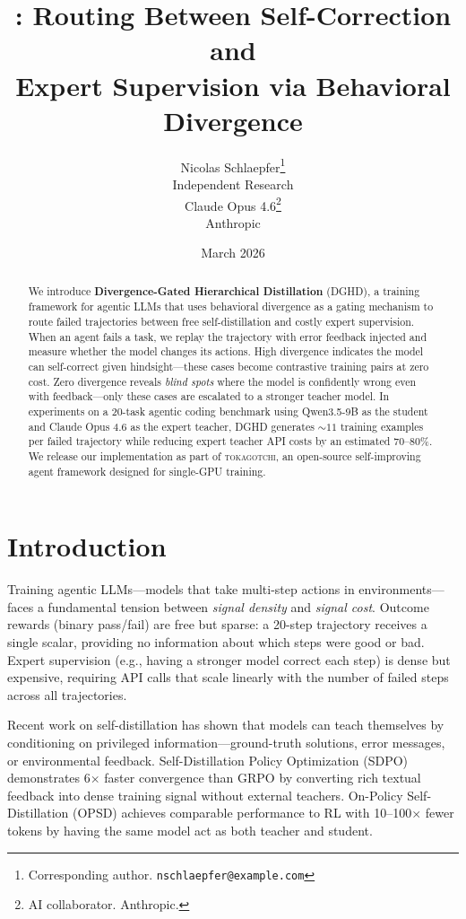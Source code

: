 \documentclass[11pt]{article}
\title{\ourslong{}: Routing Between Self-Correction and\\Expert Supervision via Behavioral Divergence}
\author{
  Nicolas Schlaepfer\thanks{Corresponding author. \texttt{nschlaepfer@example.com}} \\
  Independent Research \\
  \And
  Claude Opus 4.6\thanks{AI collaborator. Anthropic.} \\
  Anthropic
}
\date{March 2026}
\newcommand{\ours}{DGHD}
\newcommand{\ourslong}{Divergence-Gated Hierarchical Distillation}
\begin{document}
\maketitle

\begin{abstract}
We introduce \textbf{\ourslong{}} (\ours{}), a training framework for agentic LLMs that uses behavioral divergence as a gating mechanism to route failed trajectories between free self-distillation and costly expert supervision. When an agent fails a task, we replay the trajectory with error feedback injected and measure whether the model changes its actions. High divergence indicates the model can self-correct given hindsight---these cases become contrastive training pairs at zero cost. Zero divergence reveals \emph{blind spots} where the model is confidently wrong even with feedback---only these cases are escalated to a stronger teacher model. In experiments on a 20-task agentic coding benchmark using Qwen3.5-9B as the student and Claude Opus 4.6 as the expert teacher, \ours{} generates ${\sim}11$ training examples per failed trajectory while reducing expert teacher API costs by an estimated 70--80\%. We release our implementation as part of \textsc{tokagotchi}, an open-source self-improving agent framework designed for single-GPU training.
\end{abstract}

\section{Introduction}
\label{sec:intro}

Training agentic LLMs---models that take multi-step actions in environments---faces a fundamental tension between \emph{signal density} and \emph{signal cost}. Outcome rewards (binary pass/fail) are free but sparse: a 20-step trajectory receives a single scalar, providing no information about which steps were good or bad. Expert supervision (e.g., having a stronger model correct each step) is dense but expensive, requiring API calls that scale linearly with the number of failed steps across all trajectories.

Recent work on self-distillation \citep{sdpo2026, opsd2026} has shown that models can teach themselves by conditioning on privileged information---ground-truth solutions, error messages, or environmental feedback. Self-Distillation Policy Optimization (SDPO) \citep{sdpo2026} demonstrates 6$\times$ faster convergence than GRPO by converting rich textual feedback into dense training signal without external teachers. On-Policy Self-Distillation (OPSD) \citep{opsd2026} achieves comparable performance to RL with 10--100$\times$ fewer tokens by having the same model act as both teacher and student.
\end{document}
